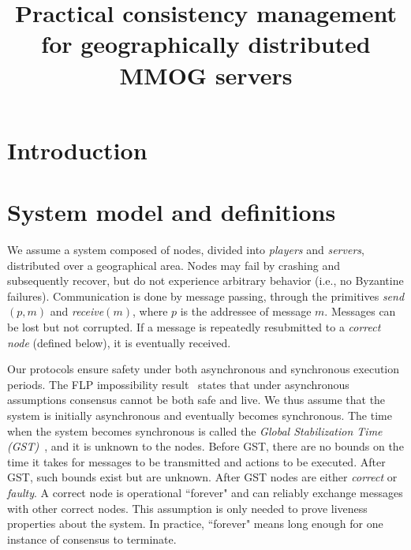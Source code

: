 \documentclass[times, 10pt]{article}
\begin{document}
\newcommand{\mv}[1]{\ensuremath{\operatorname{\mathit{#1}}}}
\newcommand{\bc}[1]{\textcolor{dark}{#1}}
\newtheorem{lems}{Lemma}
\newtheorem{props}{Proposition}
\newtheorem{thms}{Theorem}
\newtheorem{defs}{Definition}
\newtheorem{obs}{Observation}

\title{Practical consistency management for geographically distributed MMOG servers}


\maketitle

\begin{abstract}


\end{abstract}

\section{Introduction}
\label{sec:intro}


\section{System model and definitions}
\label{sec:model}

We assume a system composed of nodes, divided into \emph{players} and \emph{servers}, distributed over a geographical area. Nodes may fail by crashing and subsequently recover, but do not experience arbitrary behavior (i.e., no Byzantine failures). Communication is done by message passing, through the primitives \emph{send}$(p,m)$ and \emph{receive}$(m)$, where $p$ is the addressee of message $m$. Messages can be lost but not corrupted. If a message is repeatedly resubmitted to a \emph{correct node} (defined below), it is eventually received.

Our protocols ensure safety under both asynchronous and synchronous execution periods. The FLP impossibility result~\cite{FLP85} states that under asynchronous assumptions consensus cannot be both safe and live. We thus assume that the system is initially asynchronous and eventually becomes synchronous. The time when the system becomes synchronous is called the \emph{Global Stabilization Time (GST)}~\cite{DLS88}, and it is unknown to the nodes.
Before GST, there are no bounds on the time it takes for messages to be transmitted and actions to be executed. After GST, such bounds exist but are unknown. After GST nodes are either \emph{correct} or \emph{faulty}. A correct node is operational ``forever" and can reliably exchange messages with other correct nodes. This assumption is only needed to prove liveness properties about the system. In practice, ``forever" means long enough for one instance of consensus to terminate.
\end{document}
